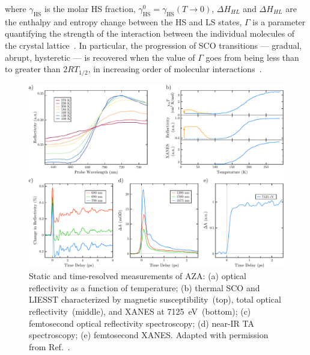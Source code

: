 %
where $\gamma_\text{HS}$ is the molar HS fraction,
$\gamma_\text{HS}^0 = \gamma_\text{HS}(T \rightarrow 0)$,
$\Delta H_{HL}$ and $\Delta H_{HL}$ are the enthalpy and entropy change between the HS and LS states,
$\Gamma$ is a parameter quantifying the strength of the interaction
between the individual molecules of the crystal lattice~\cite{SCO-III}.
%
In particular, the progression of SCO transitions --- gradual, abrupt, hysteretic ---
is recovered when the value of $\Gamma$ goes from being less than to greater than $2 R T_{1/2}$,
in increasing order of molecular interactions~\cite{Capes2000, Hayami2003,
Marchivie2003, Marchivie2005, Kepenekian2009}.

\begin{figure}[t!]
  \centering
  \includegraphics[width = \textwidth]{Figures/fig_AZA_review.pdf}
  \caption[Static and time-resolved measurements of AZA.]{
    Static and time-resolved measurements of AZA:
    (a) optical reflectivity as a function of temperature;
    (b) thermal SCO and LIESST characterized
    by magnetic susceptibility~(top), total optical reflectivity~(middle),
    and XANES at 7125~eV~(bottom);
    (c) femtosecond optical reflectivity spectroscopy;
    (d) near-IR TA spectroscopy;
    (e) femtosecond XANES.
    Adapted with permission from Ref.~\cite{Marino2016}.
  }
  \label{fig: AZA-review}
\end{figure}

